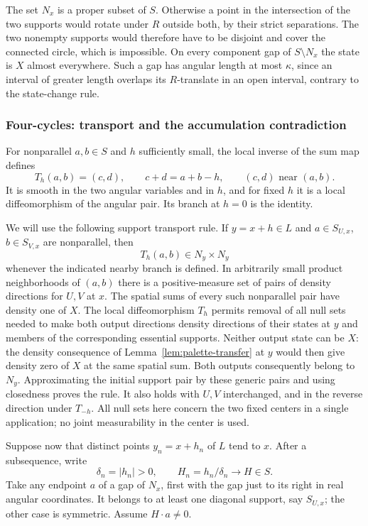 The set $N_x$ is a proper subset of $S$.  Otherwise a point in the
intersection of the two supports would rotate under $R$ outside
both, by their strict separations.  The two nonempty supports would
therefore have to be disjoint and cover the connected circle, which
is impossible.  On every component gap of $S\setminus N_x$ the
state is $X$ almost everywhere.  Such a gap has angular length at
most $\kappa$, since an interval of greater length overlaps its
$R$-translate in an open interval, contrary to the state-change
rule.

\subsubsection{Four-cycles: transport and the accumulation contradiction}

For nonparallel $a,b\in S$ and $h$ sufficiently small, the local
inverse of the sum map defines
\[
 T_h(a,b)=(c,d),\qquad c+d=a+b-h,
 \qquad (c,d)\text{ near }(a,b).
\]
It is smooth in the two angular variables and in $h$, and for fixed
$h$ it is a local diffeomorphism of the angular pair.  Its branch at
$h=0$ is the identity.

We will use the following support transport rule.  If $y=x+h\in L$
and $a\in S_{U,x}$, $b\in S_{V,x}$ are nonparallel, then
\[
 T_h(a,b)\in N_y\times N_y
\]
whenever the indicated nearby branch is defined.  In arbitrarily
small product neighborhoods of $(a,b)$ there is a positive-measure
set of pairs of density directions for $U,V$ at $x$.  The spatial
sums of every such nonparallel pair have density one of $X$.
The local diffeomorphism $T_h$ permits removal of all null sets
needed to make both output directions density directions of their
states at $y$ and members of the corresponding essential supports.
Neither output state can be $X$: the density consequence of
Lemma~\ref{lem:palette-transfer} at $y$ would then give density zero
of $X$ at the same spatial sum.  Both outputs consequently belong
to $N_y$.  Approximating the initial support pair by these generic
pairs and using closedness proves the rule.  It also holds with
$U,V$ interchanged, and in the reverse direction under $T_{-h}$.
All null sets here concern the two fixed centers in a single
application; no joint measurability in the center is used.

Suppose now that distinct points $y_n=x+h_n$ of $L$ tend to $x$.
After a subsequence, write
\[
 \delta_n=|h_n|>0,\qquad H_n=h_n/\delta_n\longrightarrow H\in S.
\]
Take any endpoint $a$ of a gap of $N_x$, first with the gap just to
its right in real angular coordinates.  It belongs to at least one
diagonal support, say $S_{U,x}$; the other case is symmetric.
Assume $H\cdot a\ne0$.

